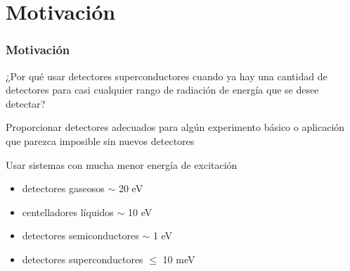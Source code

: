 \documentclass{beamer}
\begin{document}
\section{Motivación}

\begin{frame}
				\frametitle{Motivación}
				\begin{alertblock}{}
								\alert{¿Por qué usar detectores superconductores cuando ya hay una cantidad de
								detectores para casi cualquier rango de radiación de energía que se
								desee detectar?}
				\end{alertblock}

				\begin{exampleblock}{}
								{\color[rgb]{0.4,0.21,0.68}Proporcionar detectores adecuados
								para algún experimento básico o aplicación que parezca imposible
								sin nuevos detectores}
				\end{exampleblock}
				\begin{exampleblock}{Usar sistemas con mucha menor energía de excitación}
								\begin{itemize}
												\item detectores gaseosos $\sim$ 20 eV
												\item centelladores líquidos $\sim$ 10 eV
												\item detectores semiconductores $\sim$ 1 eV
												\item \alert{detectores superconductores $\leq$ 10 meV}
								\end{itemize}
				\end{exampleblock}
\end{frame}
\end{document}
